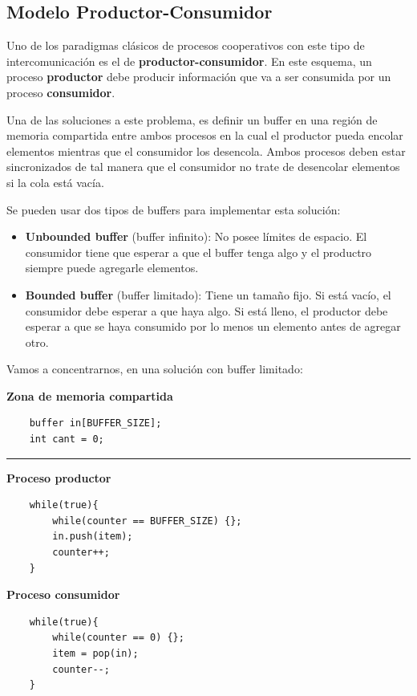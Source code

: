 \subsection{Modelo Productor-Consumidor}
Uno de los paradigmas clásicos de procesos cooperativos con este tipo de intercomunicación es el de \textbf{productor-consumidor}. En este esquema, un proceso \textbf{productor} debe producir información que va a ser consumida por un proceso \textbf{consumidor}.

Una de las soluciones a este problema, es definir un buffer en una región de memoria compartida entre ambos procesos en la cual el productor pueda encolar elementos mientras que el consumidor los desencola. Ambos procesos deben estar sincronizados de tal manera que el consumidor no trate de desencolar elementos si la cola está vacía.

Se pueden usar dos tipos de buffers para implementar esta solución:
\begin{itemize}
	\item \textbf{Unbounded buffer} (buffer infinito): No posee límites de espacio. El consumidor tiene que esperar a que el buffer tenga algo y el productro siempre puede agregarle elementos.
	\item \textbf{Bounded buffer} (buffer limitado): Tiene un tamaño fijo. Si está vacío, el consumidor debe esperar a que haya algo. Si está lleno, el productor debe esperar a que se haya consumido por lo menos un elemento antes de agregar otro.
\end{itemize}

Vamos a concentrarnos, en una solución con buffer limitado:

\vspace*{0.25cm}
\begin{center}
		\textbf{Zona de memoria compartida}
	\begin{verbatim}
	buffer in[BUFFER_SIZE];
	int cant = 0;
	\end{verbatim}
\end{center}
\setlength{\columnseprule}{0.4pt}
\noindent\rule{\textwidth}{0.4pt}
\begin{multicols}{2}
	\begin{center}
	\textbf{Proceso productor}

	\begin{verbatim}
	while(true){
		while(counter == BUFFER_SIZE) {};
		in.push(item);
		counter++;
	}
	\end{verbatim}
\columnbreak
\textbf{Proceso consumidor}
	\begin{verbatim}
	while(true){
		while(counter == 0) {};
		item = pop(in);
		counter--;
	}
	\end{verbatim}
	\end{center}
\end{multicols}
\setlength{\columnseprule}{0pt}

